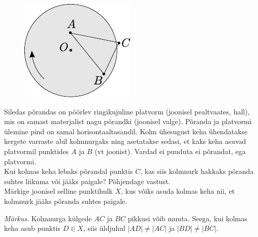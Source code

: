\documentclass[10pt]{article}
\begin{document}
{
\begin{figure}
	\begin{center}
		\vspace{-20pt}
		\includegraphics[width=\linewidth]{2005-v3g-10-yl}
	\end{center}
\end{figure}
Siledas põrandas on pöörlev ringikujuline platvorm (joonisel pealtvaates, hall), mis on samast materjalist nagu põrandki (joonisel valge). Põranda ja platvormi ülemine pind on samal horisontaaltasandil. Kolm ühesugust keha ühendatakse kergete varraste abil kolmnurgaks ning asetatakse sedasi, et kaks keha asuvad platvormil punktides $A$ ja $B$ (vt joonist). Vardad ei puuduta ei põrandat, ega platvormi.\\
\osa Kui kolmas keha lebaks põrandal punktis $C$, kas siis kolmnurk hakkaks põranda suhtes liikuma või jääks paigale? Põhjendage vastust.\\
\osa Märkige joonisel selline punktihulk $X$, kus võiks asuda kolmas keha nii, et kolmnurk jääks põranda suhtes paigale.

\emph{Märkus}. Kolmnurga külgede $AC$ ja $BC$ pikkusi võib muuta. Seega, kui kolmas keha asub punktis $D \in X$, siis üldjuhul $|AD| \neq |AC|$ ja $|BD| \neq |BC|$.
\probend
\bigskip
\newpage\subsection{\protect{}}

}
\end{document}
